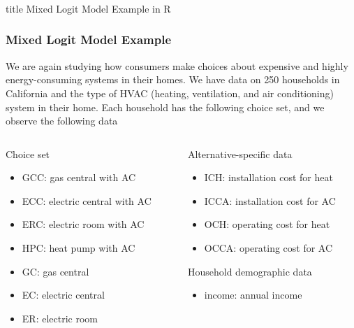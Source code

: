 \documentclass{beamer}\usepackage[]{graphicx}\usepackage[]{color}
\begin{document}
\begin{frame}\frametitle{}
    \vfill
    \centering
    \begin{beamercolorbox}[center]{title}
        \Large Mixed Logit Model Example in R
    \end{beamercolorbox}
    \vfill
\end{frame}

\begin{frame}\frametitle{Mixed Logit Model Example}
    We are again studying how consumers make choices about expensive and highly energy-consuming systems in their homes. We have data on 250 households in California and the type of HVAC (heating, ventilation, and air conditioning) system in their home. Each household has the following choice set, and we observe the following data \\
    \vspace{3ex}
    \begin{columns}
    	\begin{column}{0.5\textwidth}
		    Choice set
		    \begin{itemize}
		    	\item GCC: gas central with AC
		    	\item ECC: electric central with AC
		    	\item ERC: electric room with AC
		    	\item HPC: heat pump with AC
		    	\item GC: gas central
		    	\item EC: electric central
		    	\item ER: electric room
		    \end{itemize}
		    \vspace{2ex}
	    \end{column}
	    \begin{column}{0.5\textwidth}
		    Alternative-specific data
		    \begin{itemize}
		    	\item ICH: installation cost for heat
		    	\item ICCA: installation cost for AC
		    	\item OCH: operating cost for heat
		    	\item OCCA: operating cost for AC
		    \end{itemize}
		    \vspace{2ex}
		    Household demographic data
		    \begin{itemize}
		    	\item income: annual income
		    \end{itemize}
		\end{column}
    \end{columns}
\end{frame}
\end{document}
